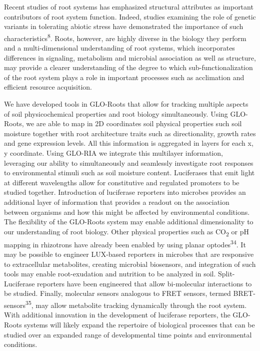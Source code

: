 \documentclass[]{article}
\begin{document}
Recent studies of root systems has emphasized structural attributes as
important contributors of root system function. Indeed, studies
examining the role of genetic variants in tolerating abiotic stress have
demonstrated the importance of such characteristics\textsuperscript{8}.
Roots, however, are highly diverse in the biology they perform and a
multi-dimensional understanding of root systems, which incorporates
differences in signaling, metabolism and microbial association as well
as structure, may provide a clearer understanding of the degree to which
sub-functionalization of the root system plays a role in important
processes such as acclimation and efficient resource acquisition.

We have developed tools in GLO-Roots that allow for tracking multiple
aspects of soil physicochemical properties and root biology
simultaneously. Using GLO-Roots, we are able to map in 2D coordinates
soil physical properties such soil moisture together with root
architecture traits such as directionality, growth rates and gene
expression levels. All this information is aggregated in layers for each
x, y coordinate. Using GLO-RIA we integrate this multilayer information,
leveraging our ability to simultaneously and seamlessly investigate root
responses to environmental stimuli such as soil moisture content.
Luciferases that emit light at different wavelengths allow for
constitutive and regulated promoters to be studied together.
Introduction of luciferase reporters into microbes provides an
additional layer of information that provides a readout on the
association between organisms and how this might be affected by
environmental conditions. The flexibility of the GLO-Roots system may
enable additional dimensionality to our understanding of root biology.
Other physical properties such as CO\textsubscript{2} or pH mapping in
rhizotrons have already been enabled by using planar
optodes\textsuperscript{34}. It may be possible to engineer LUX-based
reporters in microbes that are responsive to extracellular metabolites,
creating microbial biosensors, and integration of such tools may enable
root-exudation and nutrition to be analyzed in soil. Split-Luciferase
reporters have been engineered that allow bi-molecular interactions to
be studied. Finally, molecular sensors analogous to FRET sensors, termed
BRET-sensors\textsuperscript{35}, may allow metabolite tracking
dynamically through the root system. With additional innovation in the
development of luciferase reporters, the GLO-Roots systems will likely
expand the repertoire of biological processes that can be studied over
an expanded range of developmental time points and environmental
conditions.
\end{document}
